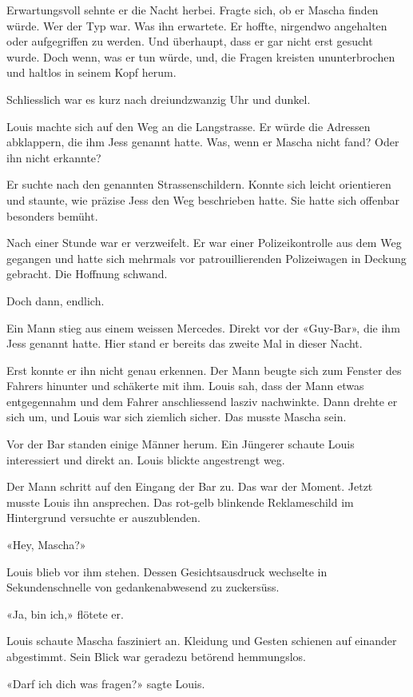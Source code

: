 Erwartungsvoll sehnte er die Nacht herbei. Fragte sich, ob er Mascha
finden würde. Wer der Typ war. Was ihn erwartete. Er hoffte, nirgendwo
angehalten oder aufgegriffen zu werden. Und überhaupt, dass er gar nicht
erst gesucht wurde. Doch wenn, was er tun würde, und, die Fragen
kreisten ununterbrochen und haltlos in seinem Kopf herum.

Schliesslich war es kurz nach dreiundzwanzig Uhr und dunkel.

Louis machte sich auf den Weg an die Langstrasse. Er würde die Adressen
abklappern, die ihm Jess genannt hatte. Was, wenn er Mascha nicht fand?
Oder ihn nicht erkannte?

Er suchte nach den genannten Strassenschildern. Konnte sich leicht
orientieren und staunte, wie präzise Jess den Weg beschrieben hatte. Sie
hatte sich offenbar besonders bemüht.

Nach einer Stunde war er verzweifelt. Er war einer Polizeikontrolle aus
dem Weg gegangen und hatte sich mehrmals vor patrouillierenden
Polizeiwagen in Deckung gebracht. Die Hoffnung schwand.

Doch dann, endlich.

Ein Mann stieg aus einem weissen Mercedes. Direkt vor der «Guy-Bar», die
ihm Jess genannt hatte. Hier stand er bereits das zweite Mal in dieser
Nacht.

Erst konnte er ihn nicht genau erkennen. Der Mann beugte sich zum
Fenster des Fahrers hinunter und schäkerte mit ihm. Louis sah, dass der
Mann etwas entgegennahm und dem Fahrer anschliessend lasziv nachwinkte.
Dann drehte er sich um, und Louis war sich ziemlich sicher. Das musste
Mascha sein.

Vor der Bar standen einige Männer herum. Ein Jüngerer schaute Louis
interessiert und direkt an. Louis blickte angestrengt weg.

Der Mann schritt auf den Eingang der Bar zu. Das war der Moment. Jetzt
musste Louis ihn ansprechen. Das rot-gelb blinkende Reklameschild im
Hintergrund versuchte er auszublenden.

«Hey, Mascha?»

Louis blieb vor ihm stehen. Dessen Gesichtsausdruck wechselte in
Sekundenschnelle von gedankenabwesend zu zuckersüss.

«Ja, bin ich,» flötete er.

Louis schaute Mascha fasziniert an. Kleidung und Gesten schienen auf
einander abgestimmt. Sein Blick war geradezu betörend hemmungslos.

«Darf ich dich was fragen?» sagte Louis.

